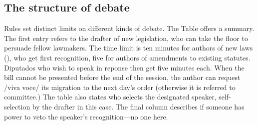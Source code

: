 \subsection{The structure of debate}
Rules set distinct limits on different kinds of debate. The Table offers a summary. The first entry refers to the drafter of new legislation, who can take the floor to persuade fellow lawmakers. The time limit is ten minutes for authors of new laws (), who get first recognition, five for authors of amendments to existing statutes. Diputados who wish to speak in reponse then get five minutes each. When the bill cannot be presented before the end of the session, the author can request /viva voce/ its migration to the next day's order (otherwise it is referred to committee.) The table also states who selects the designated speaker, self-selection by the drafter in this case. The final column describes if someone has power to veto the speaker's recognition---no one here. 

